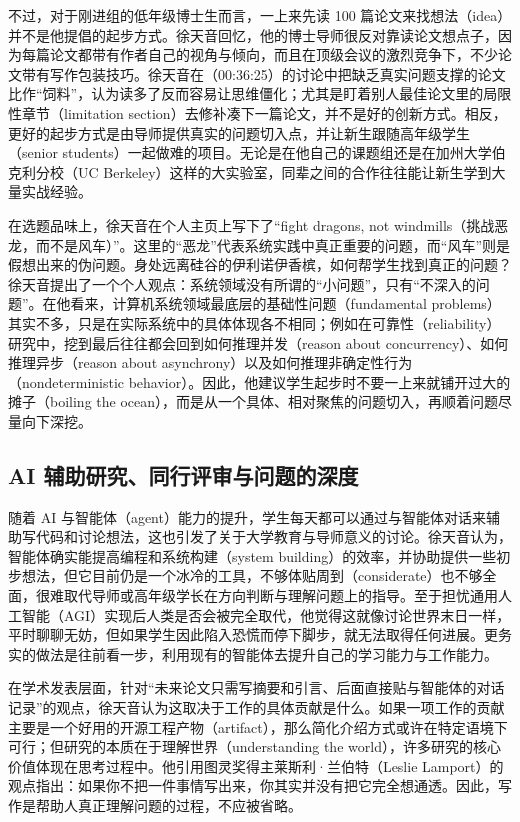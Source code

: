 \documentclass[UTF8,a4paper,11pt,fontset=fandol]{ctexart}
\begin{document}
不过，对于刚进组的低年级博士生而言，一上来先读 100 篇论文来找想法（idea）并不是他提倡的起步方式。徐天音回忆，他的博士导师很反对靠读论文想点子，因为每篇论文都带有作者自己的视角与倾向，而且在顶级会议的激烈竞争下，不少论文带有写作包装技巧。徐天音在（00:36:25）的讨论中把缺乏真实问题支撑的论文比作“饲料”，认为读多了反而容易让思维僵化；尤其是盯着别人最佳论文里的局限性章节（limitation section）去修补凑下一篇论文，并不是好的创新方式。相反，更好的起步方式是由导师提供真实的问题切入点，并让新生跟随高年级学生（senior students）一起做难的项目。无论是在他自己的课题组还是在加州大学伯克利分校（UC Berkeley）这样的大实验室，同辈之间的合作往往能让新生学到大量实战经验。

在选题品味上，徐天音在个人主页上写下了“fight dragons, not windmills（挑战恶龙，而不是风车）”。这里的“恶龙”代表系统实践中真正重要的问题，而“风车”则是假想出来的伪问题。身处远离硅谷的伊利诺伊香槟，如何帮学生找到真正的问题？徐天音提出了一个个人观点：系统领域没有所谓的“小问题”，只有“不深入的问题”。在他看来，计算机系统领域最底层的基础性问题（fundamental problems）其实不多，只是在实际系统中的具体体现各不相同；例如在可靠性（reliability）研究中，挖到最后往往都会回到如何推理并发（reason about concurrency）、如何推理异步（reason about asynchrony）以及如何推理非确定性行为（nondeterministic behavior）。因此，他建议学生起步时不要一上来就铺开过大的摊子（boiling the ocean），而是从一个具体、相对聚焦的问题切入，再顺着问题尽量向下深挖。

\subsection{AI 辅助研究、同行评审与问题的深度}
随着 AI 与智能体（agent）能力的提升，学生每天都可以通过与智能体对话来辅助写代码和讨论想法，这也引发了关于大学教育与导师意义的讨论。徐天音认为，智能体确实能提高编程和系统构建（system building）的效率，并协助提供一些初步想法，但它目前仍是一个冰冷的工具，不够体贴周到（considerate）也不够全面，很难取代导师或高年级学长在方向判断与理解问题上的指导。至于担忧通用人工智能（AGI）实现后人类是否会被完全取代，他觉得这就像讨论世界末日一样，平时聊聊无妨，但如果学生因此陷入恐慌而停下脚步，就无法取得任何进展。更务实的做法是往前看一步，利用现有的智能体去提升自己的学习能力与工作能力。

在学术发表层面，针对“未来论文只需写摘要和引言、后面直接贴与智能体的对话记录”的观点，徐天音认为这取决于工作的具体贡献是什么。如果一项工作的贡献主要是一个好用的开源工程产物（artifact），那么简化介绍方式或许在特定语境下可行；但研究的本质在于理解世界（understanding the world），许多研究的核心价值体现在思考过程中。他引用图灵奖得主莱斯利·兰伯特（Leslie Lamport）的观点指出：如果你不把一件事情写出来，你其实并没有把它完全想通透。因此，写作是帮助人真正理解问题的过程，不应被省略。
\end{document}
